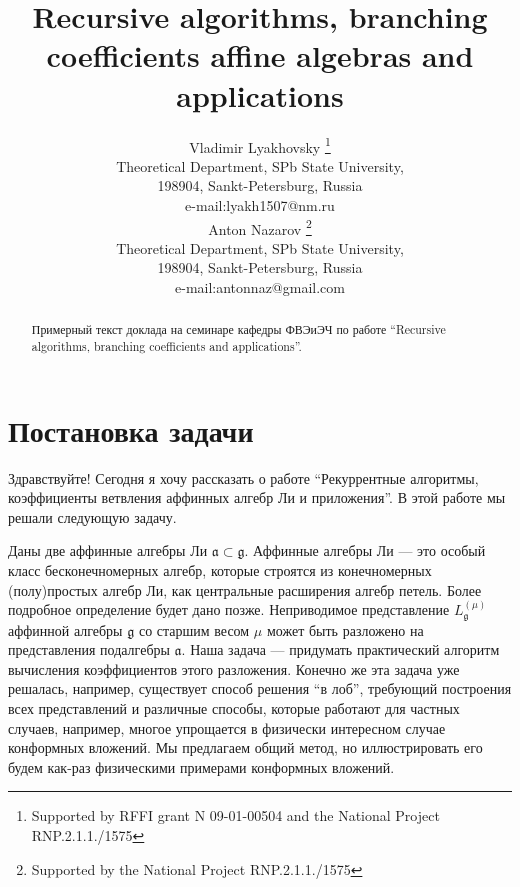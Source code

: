 \documentclass[a4paper,12pt]{article}
\theoremstyle{definition} \newtheorem{Def}{Definition}
\begin{document}
\title{\textbf{{\Large {Recursive algorithms, branching coefficients affine algebras and applications}}}}
\author{Vladimir Lyakhovsky \thanks{ Supported by
 RFFI grant N 09-01-00504 and the National Project RNP.2.1.1./1575 }\\
Theoretical Department, SPb State University,\\
198904, Sankt-Petersburg, Russia \\
e-mail:lyakh1507@nm.ru \\
[5mm] Anton Nazarov \thanks{ Supported by
the National Project RNP.2.1.1./1575 }\\
Theoretical Department, SPb State University,\\
198904, Sankt-Petersburg, Russia \\
e-mail:antonnaz@gmail.com
}
\maketitle

\begin{abstract}
Примерный текст доклада на семинаре кафедры ФВЭиЭЧ по работе ``Recursive algorithms, branching coefficients and applications''.
\end{abstract}

\section{Постановка задачи}
\label{sec:task}

Здравствуйте!
Сегодня я хочу рассказать о работе ``Рекуррентные алгоритмы, коэффициенты ветвления аффинных алгебр
Ли и приложения''. В этой работе мы решали следующую задачу.

Даны две аффинные алгебры Ли $\mathfrak{a}\subset \mathfrak{g}$. Аффинные алгебры Ли --- это особый
класс бесконечномерных алгебр, которые строятся из конечномерных (полу)простых алгебр Ли, как
центральные расширения алгебр петель. Более подробное определение будет дано позже. Неприводимое
представление $L^{(\mu)}_{\mathfrak{g}}$ аффинной алгебры $\mathfrak{g}$ со старшим весом $\mu$
может быть разложено на представления подалгебры $\mathfrak{a}$. Наша задача --- придумать
практический алгоритм вычисления коэффициентов этого разложения. Конечно же эта задача уже решалась,
например, существует способ решения ``в лоб'', требующий построения всех представлений и различные способы,
которые работают для частных случаев, например, многое упрощается в физически интересном случае
конформных вложений. Мы предлагаем общий метод, но иллюстрировать его будем как-раз физическими
примерами конформных вложений.
\end{document}
